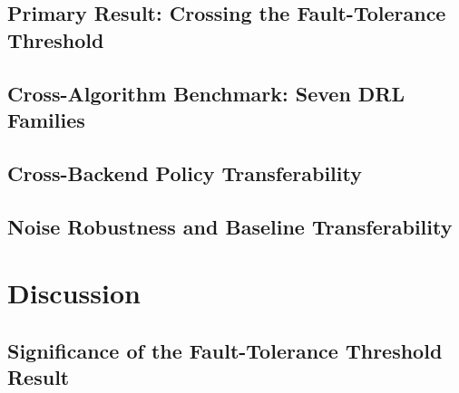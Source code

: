 \documentclass[twocolumn]{article}
\begin{document}
\subsection{Primary Result: Crossing the Fault-Tolerance Threshold}

\subsection{Cross-Algorithm Benchmark: Seven DRL Families}

\subsection{Cross-Backend Policy Transferability}

\subsection{Noise Robustness and Baseline Transferability}

\section{Discussion}

\subsection{Significance of the Fault-Tolerance Threshold Result}
\end{document}
